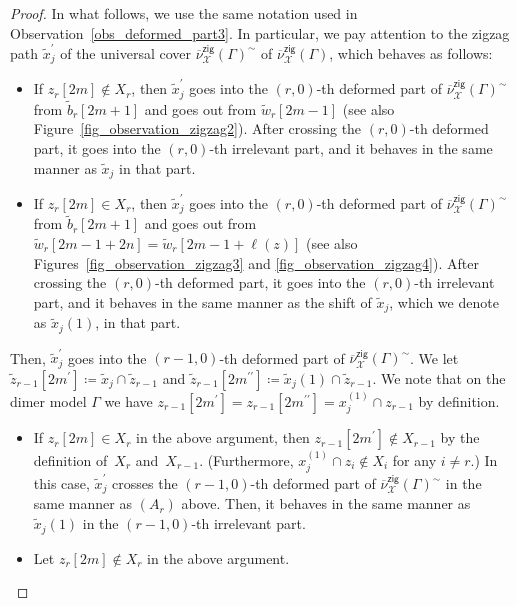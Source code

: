 \documentclass[11pt]{article}
\numberwithin{equation}{section}
\numberwithin{equation}{section}
\numberwithin{figure}{section}
\numberwithin{table}{section}
\newcommand{\calX}{\mathcal{X}}
\newcommand{\zig}{\mathsf{zig}}
\begin{document}
\begin{proof}
In what follows, we use the same notation used in Observation~\ref{obs_deformed_part3}.
In particular, we pay attention to the zigzag path $\widetilde{x}_j^\prime$ of the universal cover $\overline{\nu}_\calX^\zig(\Gamma)^\sim$ of $\overline{\nu}_\calX^\zig(\Gamma)$, which behaves as follows:
\begin{itemize}\itemsep=0pt
\item[$(A_r)$] If $z_r[2m]\not\in X_r$, then $\widetilde{x}_j^\prime$ goes into the $(r,0)$-th deformed part of $\overline{\nu}_\calX^\zig(\Gamma)^\sim$ from $\widetilde{b}_r[2m+1]$ and goes out from $\widetilde{w}_r[2m-1]$ (see also Figure~\ref{fig_observation_zigzag2}).
After crossing the $(r,0)$-th deformed part, it goes into the $(r,0)$-th irrelevant part, and it behaves in the same manner as $\widetilde{x}_j$ in that part.
\item[$(B_r)$] If $z_r[2m]\in X_r$, then $\widetilde{x}_j^\prime$ goes into the $(r,0)$-th deformed part of $\overline{\nu}_\calX^\zig(\Gamma)^\sim$ from $\widetilde{b}_r[2m+1]$ and goes out from $\widetilde{w}_r[2m-1+2n]=\widetilde{w}_r[2m-1+\ell(z)]$ (see also Figures~\ref{fig_observation_zigzag3} and \ref{fig_observation_zigzag4}).
After crossing the $(r,0)$-th deformed part, it goes into the $(r,0)$-th irrelevant part, and it behaves in the same manner as the shift of $\widetilde{x}_j$, which we denote as $\widetilde{x}_j(1)$, in that part.
\end{itemize}
Then, $\widetilde{x}_j^\prime$ goes into the $(r-1,0)$-th deformed part of $\overline{\nu}_\calX^\zig(\Gamma)^\sim$.
We let $\widetilde{z}_{r-1}[2m^\prime]\coloneqq \widetilde{x}_j\cap \widetilde{z}_{r-1}$ and $\widetilde{z}_{r-1}[2m^{\prime\prime}]\coloneqq \widetilde{x}_j(1)\cap \widetilde{z}_{r-1}$.
We note that on the dimer model $\Gamma$ we have $z_{r-1}[2m^\prime]=z_{r-1}[2m^{\prime\prime}]=x_j^{(1)}\cap z_{r-1}$ by definition.
\begin{itemize}\itemsep=0pt
\item If $z_r[2m]\in X_r$ in the above argument, then $z_{r-1}[2m^\prime]\not\in X_{r-1}$ by the definition of~$X_r$ and~$X_{r-1}$.
(Furthermore, $x_j^{(1)}\cap z_i\not\in X_i$ for any $i\neq r$.)
In this case, $\widetilde{x}_j^\prime$ crosses the $(r-1,0)$-th deformed part of $\overline{\nu}_\calX^\zig(\Gamma)^\sim$ in the same manner as $(A_r)$ above.
Then, it behaves in the same manner as $\widetilde{x}_j(1)$ in the $(r-1,0)$-th irrelevant part.
\item Let $z_r[2m]\not\in X_r$ in the above argument.
\begin{itemize}\itemsep=0pt

\end{itemize}
\end{itemize}
\end{proof}
\end{document}

